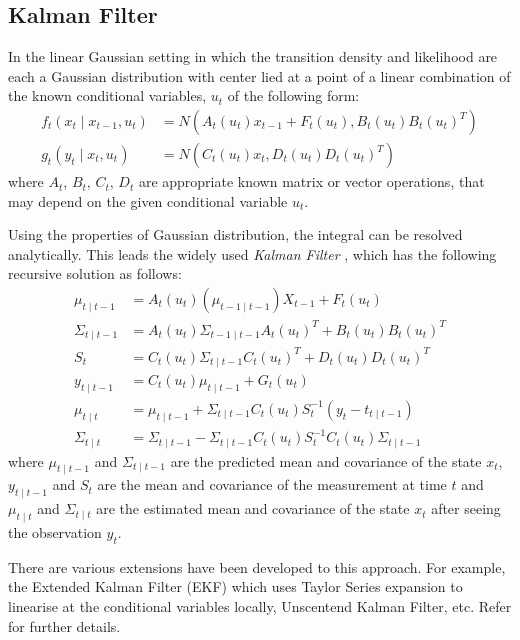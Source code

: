 \subsection{Kalman Filter}
In the linear Gaussian setting in which the transition density and likelihood are each a Gaussian distribution with center lied at a point of a linear combination of the known conditional variables, $u_t$ of the following form:
\begin{align}
  f_t(x_t \mid x_{t-1}, u_t) &= N(A_t(u_t) x_{t-1} + F_t(u_t), B_t(u_t)B_t(u_t)^T) \nonumber \\
  g_t(y_t \mid x_t, u_t)    &= N(C_t(u_t) x_t, D_t(u_t)D_t(u_t)^T)
\end{align}
where $A_t$, $B_t$, $C_t$, $D_t$ are appropriate known matrix or vector operations, that may depend on the given conditional variable $u_t$.

Using the properties of Gaussian distribution, the integral can be resolved analytically. This leads the widely used \emph{Kalman Filter} \cite{KRE60}, which has the following recursive solution as follows:
\begin{align}
  \mu_{t \mid t -1} &= A_{t}(u_t)(\mu_{t-1 \mid t-1})X_{t-1} + F_t(u_t) \\
  \Sigma_{t \mid t -1} &= A_{t}(u_t)\Sigma_{t -1 \mid t -1}A_{t}(u_t)^T +  B_t(u_t)B_t(u_t)^T \\
  S_t &=  C_{t}(u_t)\Sigma_{t \mid t -1}C_{t}(u_t)^T +  D_t(u_t)D_t(u_t)^T \\
  y_{t \mid t-1} &=  C_{t}(u_t)  \mu_{t \mid t -1} + G_t(u_t) \\
  \mu_{t \mid t} &=   \mu_{t \mid t -1} +   \Sigma_{t \mid t -1} C_{t}(u_t)S_t^{-1}(y_t - t_{t \mid t-1}) \\
  \Sigma_{t \mid t} &=  \Sigma_{t \mid t -1} -\Sigma_{t \mid t -1} C_{t}(u_t)S_t^{-1} C_{t}(u_t)\Sigma_{t \mid t -1}
\end{align}
where  $\mu_{t \mid t -1}$ and $\Sigma_{t \mid t -1}$ are the predicted mean and covariance of the state $x_t$, $y_{t \mid t-1}$ and $S_t$ are the mean and covariance of the measurement at time $t$ and $\mu_{t \mid t}$ and $\Sigma_{t \mid t}$ are the estimated mean and covariance of the state $x_t$ after seeing the observation $y_t$.

There are various extensions have been developed to this approach. For example, the Extended Kalman Filter (EKF) which uses Taylor Series expansion to linearise at the conditional variables locally, Unscentend Kalman Filter, etc. Refer \cite{WG95} for further details.


